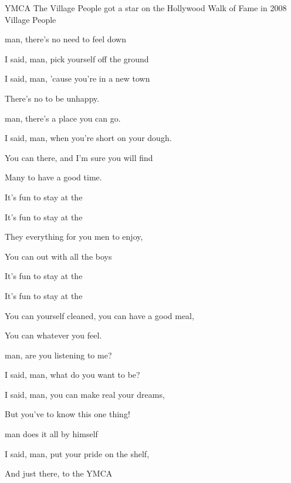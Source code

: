 \begin{SBSong}{YMCA}
  {The Village People got a star on the Hollywood Walk of Fame in 2008}
  {Village People}
  \begin{SBVerse}
     man, there's no need to feel down

    I said,  man, pick yourself off the ground

    I said,  man, 'cause you're in a new town

    There's no  to be unhappy.

     man, there's a place you can go.

    I said,  man, when you're short on your dough.

    You can  there, and I'm sure you will find

    Many  to have a good time.
  \end{SBVerse}
  \begin{SBChorus}
    It's fun to stay at the 

    It's fun to stay at the 

    They  everything for you men to enjoy,

    You can  out with all the boys

    It's fun to stay at the 

    It's fun to stay at the 

    You can  yourself cleaned, you can have a good meal,

    You can  whatever you feel.
  \end{SBChorus}
  \begin{SBVerse}
     man, are you listening to me?

    I said,  man, what do you want to be?

    I said,  man, you can make real your dreams,

    But you've  to know this one thing!

     man does it all by himself

    I said,  man, put your pride on the shelf,

    And just  there, to the YMCA


\end{SBVerse}
\end{SBSong}
